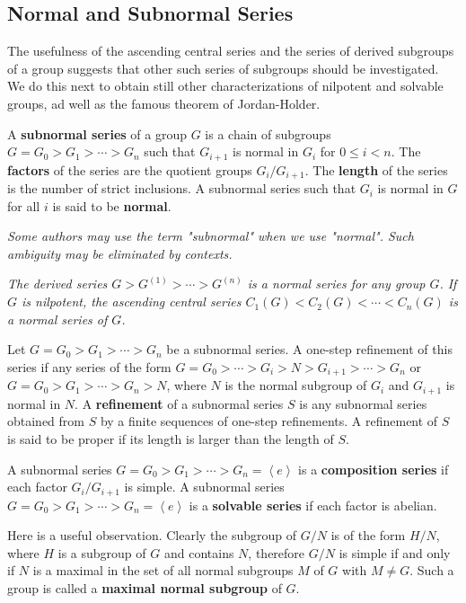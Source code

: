 \subsection{Normal and Subnormal Series}
The usefulness of the ascending central series and the series of derived subgroups of a group suggests that other such series of subgroups should be investigated. We do this next to obtain still other characterizations of nilpotent and solvable groups, ad well as the famous theorem of Jordan-Holder.
\begin{definition}
A \textbf{subnormal series} of a group $G$ is a chain of subgroups $G=G_0>G_1>\cdots>G_n$ such that $G_{i+1}$ is normal in $G_i$ for $0\le i<n$. The \textbf{factors} of the series are the quotient groups $G_i/G_{i+1}$. The \textbf{length} of the series is the number of strict inclusions. A subnormal series such that $G_i$ is normal in $G$ for all $i$ is said to be \textbf{normal}.
\end{definition}
\begin{note}\em
Some authors may use the term "subnormal" when we use "normal". Such ambiguity may be eliminated by contexts.
\end{note}
\begin{example}\em
The derived series $G>G^{(1)}>\cdots>G^{(n)}$ is a normal series for any group $G$. If $G$ is nilpotent, the ascending central series $C_1(G)<C_2(G)<\cdots<C_n(G)$ is a normal series of $G$.
\end{example}
\begin{definition}
Let $G=G_0>G_1>\cdots>G_n$ be a subnormal series. A one-step refinement of this series if any series of the form $G=G_0>\cdots>G_i>N>G_{i+1}>\cdots>G_n$ or $G=G_0>G_1>\cdots>G_n>N$, where $N$ is the normal subgroup of $G_i$ and $G_{i+1}$ is normal in $N$. A \textbf{refinement} of a subnormal series $S$ is any subnormal series obtained from $S$ by a finite sequences of one-step refinements. A refinement of $S$ is said to be proper if its length is larger than the length of $S$.
\end{definition}
A subnormal series $G=G_0>G_1>\cdots>G_n=\left<e\right>$ is a \textbf{composition series} if each factor $G_i/G_{i+1}$ is simple. A subnormal series $G=G_0>G_1>\cdots>G_n=\left<e\right>$ is a \textbf{solvable series} if each factor is abelian.\par
Here is a useful observation. Clearly the subgroup of $G/N$ is of the form $H/N$, where $H$ is a subgroup of $G$ and contains $N$, therefore $G/N$ is simple if and only if $N$ is a maximal in the set of all normal subgroups $M$ of $G$ with $M\ne G$. Such a group is called a \textbf{maximal normal subgroup} of $G$.
